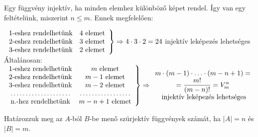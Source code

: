 \begin{solution}
	Egy függvény injektív, ha minden elemhez különböző képet rendel. Így
	van egy feltételünk, miszerint $n\leq m$. Ennek megfelelően:
	
	$\begin{rcases}\begin{array}{cc}
			\text{1-eshez rendelhetünk} & 4\text{ elemet}\\
			\text{2-eshez rendelhetünk} & 3\text{ elemet}\\
			\text{3-eshez rendelhetünk} & 2\text{ elemet}
	\end{array}\end{rcases}\Rightarrow4\cdot3\cdot2=24$ injektív leképezés lehetséges \\
	Általánosan: \\
	$\begin{rcases}\begin{array}{cc}
			\text{1-eshez rendelhetünk} & m\text{ elemet}\\
			\text{2-eshez rendelhetünk} & m-1\text{ elemet}\\
			\text{3-eshez rendelhetünk} & m-2\text{ elemet}\\
			\dotfill & \dotfill\\
			\text{n.-hez rendelhetünk} & m-n+1\text{ elemet}
	\end{array}\end{rcases}\Rightarrow\begin{array}{cc}
		m\cdot(m-1)\cdot\ldots\cdot(m-n+1)=\\
		={\displaystyle {\frac{m!}{(m-n)!}=V_{m}^{n}}}\\
		\text{ injektív leképezés lehetséges}
	\end{array}$ 
\end{solution}
\begin{problem}
	Határozzuk meg az $A$-ból $B$-be menő szürjektív függvények számát,
	ha $|A|=n$ és $|B|=m$. 
\end{problem}
